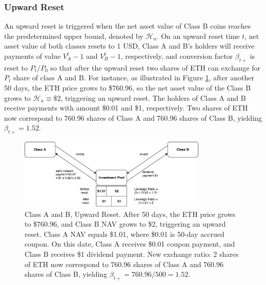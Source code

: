 \documentclass[11pt]{article}%
\numberwithin{equation}{section}
\theoremstyle{plain}
\begin{document}
\subsubsection{Upward Reset}
An upward reset is triggered when the net asset value of Class B coins reaches the predetermined upper bound, denoted by $\mathcal{H}_{u}$. On an upward reset time $t$, net asset value of both classes resets to 1 USD, Class A and B's holders will receive payments of value $V_{A}^{t}-1$ and $V_{B}^{t}-1$, respectively, and conversion factor $\beta_{t+}$ is reset to $P_t/P_0$ so that after the upward reset two shares of ETH can exchange for $P_t$ share of class A and B. For instance, as illustrated in Figure \ref{fig:upward}, after another 50 days, the ETH price grows to \$760.96, so the net asset value of the Class B grows to $\mathcal{H}_{u}\equiv \$2$, triggering an upward reset. The holders of Class A and B receive payments with amount \$0.01 and \$1, respectively. Two shares of ETH now correspond to 760.96 shares of Class A and 760.96 shares of Class B, yielding $\beta_{t+}=1.52$.

\begin{figure}[!htb]
	\centering
	\includegraphics[width=0.8\textwidth]{upward}
	\caption{Class A and B, Upward Reset. After 50 days, the ETH price grows to \$760.96, and Class B NAV grows to \$2, triggering an upward reset. Class A NAV equals \$1.01, where \$0.01 is 50-day accrued coupon. On this date, Class A receives \$0.01 coupon payment, and Class B receives \$1 dividend payment. New exchange ratio: 2 shares of ETH now correspond to 760.96 shares of Class A and 760.96 shares of Class B, yielding $\beta_{t+}=760.96/500=1.52$. }\label{fig:upward}
\end{figure}
\end{document}
